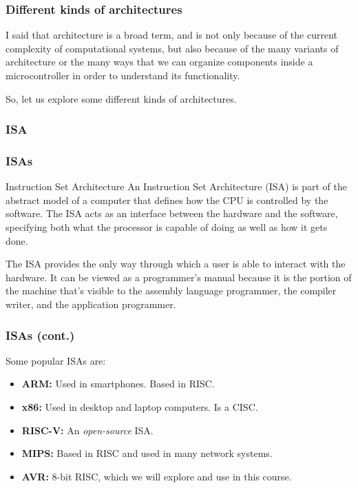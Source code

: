 \documentclass[aspectratio=169]{beamer}
\begin{document}
\begin{frame}
  \frametitle{Different kinds of architectures}
  I said that architecture is a broad term, and is not only because of the current complexity of computational systems, but also because of the many variants of architecture or the many ways that we can organize components inside a microcontroller in order to understand its functionality. \pause

  So, let us explore some different kinds of architectures.
\end{frame}

\subsubsection{ISA}
\begin{frame}
  \frametitle{ISAs}
    \begin{block}{Instruction Set Architecture}
      An Instruction Set Architecture (ISA) is part of the abstract model of a computer that defines how the CPU is controlled by the software. The ISA acts as an interface between the hardware and the software, specifying both what the processor is capable of doing as well as how it gets done. \cite{ISA} \pause
    \end{block} 
    The ISA provides the only way through which a user is able to interact with the hardware. It can be viewed as a programmer's manual because it is the portion of the machine that's visible to the assembly language programmer, the compiler writer, and the application programmer. 
  \end{frame}

\begin{frame}
  \frametitle{ISAs (cont.)}
  Some popular ISAs are: \pause
  \begin{itemize}
    \item <2-> \textbf{ARM:} Used in smartphones. Based in RISC.
    \item <3-> \textbf{x86:} Used in desktop and laptop computers. Is a CISC.
    \item <4-> \textbf{RISC-V:} An \textit{open-source} ISA.
    \item <5-> \textbf{MIPS:} Based in RISC and used in many network systems.
    \item <6-> \textbf{AVR:} 8-bit RISC, which we will explore and use in this course.
  \end{itemize}
\end{frame}
\end{document}
